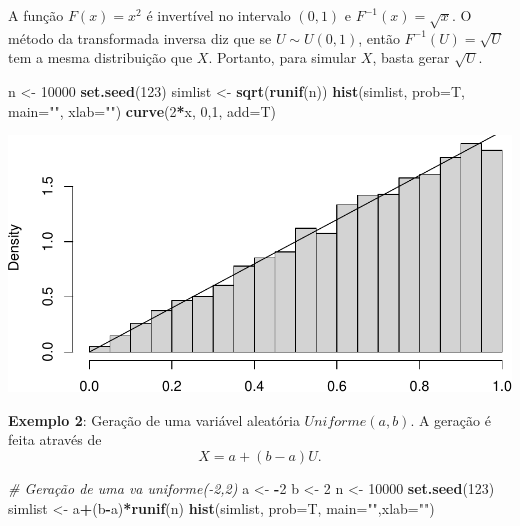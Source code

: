 \documentclass[
]{book}
\newenvironment{Shaded}{\begin{snugshade}}{\end{snugshade}}
\newcommand{\AttributeTok}[1]{\textcolor[rgb]{0.13,0.29,0.53}{#1}}
\newcommand{\CommentTok}[1]{\textcolor[rgb]{0.56,0.35,0.01}{\textit{#1}}}
\newcommand{\DecValTok}[1]{\textcolor[rgb]{0.00,0.00,0.81}{#1}}
\newcommand{\FunctionTok}[1]{\textcolor[rgb]{0.13,0.29,0.53}{\textbf{#1}}}
\newcommand{\NormalTok}[1]{#1}
\newcommand{\OtherTok}[1]{\textcolor[rgb]{0.56,0.35,0.01}{#1}}
\newcommand{\SpecialCharTok}[1]{\textcolor[rgb]{0.81,0.36,0.00}{\textbf{#1}}}
\newcommand{\StringTok}[1]{\textcolor[rgb]{0.31,0.60,0.02}{#1}}
\begin{document}
A função \(F(x)=x^2\) é invertível no intervalo \((0,1)\) e
\(F^{-1}(x)=\sqrt{x}\). O método da transformada inversa diz que se
\(U\sim U(0,1)\), então \(F^{-1}(U)=\sqrt{U}\) tem a mesma distribuição que
\(X\). Portanto, para simular \(X\), basta gerar \(\sqrt{U}\).

\begin{Shaded}
\begin{Highlighting}[]
\NormalTok{n }\OtherTok{\textless{}{-}} \DecValTok{10000}
\FunctionTok{set.seed}\NormalTok{(}\DecValTok{123}\NormalTok{)}
\NormalTok{simlist }\OtherTok{\textless{}{-}} \FunctionTok{sqrt}\NormalTok{(}\FunctionTok{runif}\NormalTok{(n))}
\FunctionTok{hist}\NormalTok{(simlist, }\AttributeTok{prob=}\NormalTok{T, }\AttributeTok{main=}\StringTok{""}\NormalTok{, }\AttributeTok{xlab=}\StringTok{""}\NormalTok{)}
\FunctionTok{curve}\NormalTok{(}\DecValTok{2}\SpecialCharTok{*}\NormalTok{x, }\DecValTok{0}\NormalTok{,}\DecValTok{1}\NormalTok{, }\AttributeTok{add=}\NormalTok{T)}
\end{Highlighting}
\end{Shaded}

\includegraphics{introR_files/figure-latex/unnamed-chunk-238-1.pdf}

\textbf{Exemplo 2}: Geração de uma variável aleatória \(Uniforme(a,b)\). A
geração é feita através de \[X = a+(b-a)U.\]

\begin{Shaded}
\begin{Highlighting}[]
\CommentTok{\# Geração de uma va uniforme({-}2,2)}
\NormalTok{a }\OtherTok{\textless{}{-}} \SpecialCharTok{{-}}\DecValTok{2}
\NormalTok{b }\OtherTok{\textless{}{-}} \DecValTok{2}
\NormalTok{n }\OtherTok{\textless{}{-}} \DecValTok{10000}
\FunctionTok{set.seed}\NormalTok{(}\DecValTok{123}\NormalTok{)}
\NormalTok{simlist }\OtherTok{\textless{}{-}}\NormalTok{ a}\SpecialCharTok{+}\NormalTok{(b}\SpecialCharTok{{-}}\NormalTok{a)}\SpecialCharTok{*}\FunctionTok{runif}\NormalTok{(n)}
\FunctionTok{hist}\NormalTok{(simlist, }\AttributeTok{prob=}\NormalTok{T, }\AttributeTok{main=}\StringTok{""}\NormalTok{,}\AttributeTok{xlab=}\StringTok{""}\NormalTok{)}
\end{Highlighting}
\end{Shaded}
\end{document}
